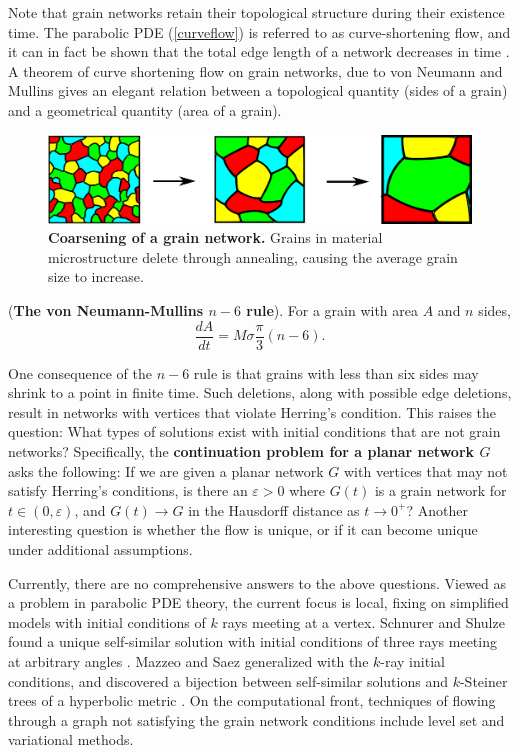 Note that grain networks retain their topological structure during their existence time.  The parabolic PDE (\ref{curveflow})  is referred to as curve-shortening flow, and it can in fact be shown that the total edge length of a network decreases in time \cite{barmak2011entropy}. A theorem of curve shortening flow on grain networks, due to von Neumann and Mullins \cite{mul56,von1952discussion} gives an elegant relation between a topological quantity (sides of a grain) and a geometrical quantity (area of a grain).

\begin{figure}
\includegraphics[width=\textwidth]{samplegrains.png}
\caption{\textbf{Coarsening of a grain network.} Grains in material microstructure delete through annealing, causing the average grain size to increase.}\label{samplegrains}
\end{figure}
 


\begin{theorem}(\textbf{The von Neumann-Mullins $n-6$ rule}). For a grain with area $A$ and $n$ sides,
\begin{equation}
\frac{dA}{dt} = M\sigma\frac \pi 3 (n-6).
\end{equation}  
\end{theorem}
One consequence of the $n-6$ rule  is  that grains with less than six sides may shrink to a point in finite time. Such deletions, along with possible edge deletions, result in networks with vertices that violate Herring's condition.  This raises the question: What types of solutions exist with initial conditions that are not grain networks?  Specifically, the \textbf{continuation problem for a planar network $G$} asks the following: If we are given a planar network $G$ with vertices that may not satisfy Herring's conditions,  is there an  $\varepsilon>0$ where $G(t)$ is a grain network for $t\in (0, \varepsilon)$, and $G(t)\rightarrow G$ in the Hausdorff distance as $t\rightarrow  0^+$? Another interesting question is whether the flow is unique, or if it can become unique under additional assumptions.

Currently, there are no comprehensive answers to the above questions.  Viewed as a problem in parabolic PDE theory, the current focus is local, fixing on simplified models with initial conditions of $k$ rays meeting at a vertex. Schnurer and Shulze found a unique self-similar solution with initial conditions of three rays meeting at arbitrary angles \cite{sch07}.  Mazzeo and Saez  generalized with the $k$-ray initial conditions, and discovered a bijection between self-similar solutions   and $k$-Steiner trees of a hyperbolic metric \cite{maz07}.  On the computational front, techniques of flowing through a graph not satisfying the grain network conditions include level set \cite{elsey2009diffusion}  and variational \cite{kin06} methods. 
 




